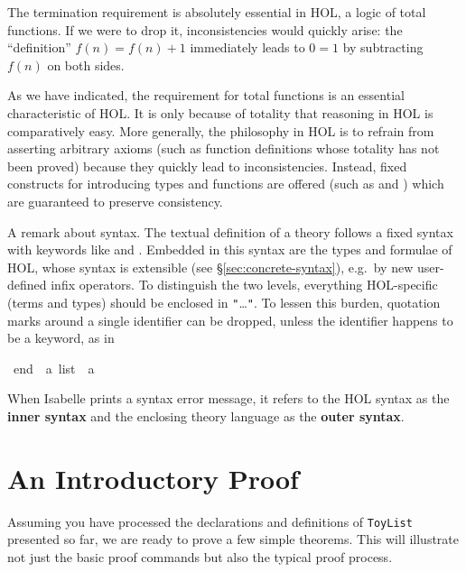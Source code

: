 \begin{isabellebody}
\begin{isamarkuptext}
The termination requirement is absolutely essential in HOL, a logic of total
functions. If we were to drop it, inconsistencies would quickly arise: the
``definition'' $f(n) = f(n)+1$ immediately leads to $0 = 1$ by subtracting
$f(n)$ on both sides.

\begin{warn}
  As we have indicated, the requirement for total functions is an essential characteristic of HOL\@. It is only
  because of totality that reasoning in HOL is comparatively easy.  More
  generally, the philosophy in HOL is to refrain from asserting arbitrary axioms (such as
  function definitions whose totality has not been proved) because they
  quickly lead to inconsistencies. Instead, fixed constructs for introducing
  types and functions are offered (such as  and
  ) which are guaranteed to preserve consistency.
\end{warn}

%
A remark about syntax.  The textual definition of a theory follows a fixed
syntax with keywords like  and .
Embedded in this syntax are the types and formulae of HOL, whose syntax is
extensible (see \S\ref{sec:concrete-syntax}), e.g.\ by new user-defined infix operators.
To distinguish the two levels, everything
HOL-specific (terms and types) should be enclosed in
\texttt{"}\dots\texttt{"}. 
To lessen this burden, quotation marks around a single identifier can be
dropped, unless the identifier happens to be a keyword, as in%
\end{isamarkuptext}%
\isamarkuptrue%
\isamarkupfalse%
\ {\isachardoublequoteopen}end{\isachardoublequoteclose}\ {\isacharcolon}{\isacharcolon}\ {\isachardoublequoteopen}{\isacharprime}a\ list\ {\isasymRightarrow}\ {\isacharprime}a{\isachardoublequoteclose}%
\begin{isamarkuptext}%
\noindent
When Isabelle prints a syntax error message, it refers to the HOL syntax as
the \textbf{inner syntax} and the enclosing theory language as the \textbf{outer syntax}.


\section{An Introductory Proof}
\label{sec:intro-proof}

Assuming you have processed the declarations and definitions of
\texttt{ToyList} presented so far, we are ready to prove a few simple
theorems. This will illustrate not just the basic proof commands but
also the typical proof process.


\end{isamarkuptext}
\end{isabellebody}
